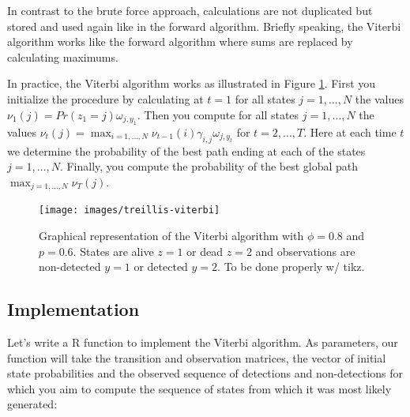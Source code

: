 \documentclass[
  12pt,
]{krantz}
\begin{document}
In contrast to the brute force approach, calculations are not duplicated but stored and used again like in the forward algorithm. Briefly speaking, the Viterbi algorithm works like the forward algorithm where sums are replaced by calculating maximums.

In practice, the Viterbi algorithm works as illustrated in Figure \ref{fig:treillis-viterbi}. First you initialize the procedure by calculating at \(t=1\) for all states \(j=1,\ldots,N\) the values \(\nu_1(j) = Pr(z_1 = j) \omega_{j,y_1}\). Then you compute for all states \(j=1,\ldots,N\) the values \(\nu_t(j) = \displaystyle{\max_{i=1,\ldots,N} \nu_{t-1}(i) \gamma_{i,j} \omega_{j,y_t}}\) for \(t = 2, \ldots, T\). Here at each time \(t\) we determine the probability of the best path ending at each of the states \(j=1,\ldots,N\). Finally, you compute the probability of the best global path \(\displaystyle{\max_{j=1,\ldots,N}\nu_T(j)}\).

\begin{figure}

{\centering \texttt{[image: images/treillis-viterbi]} 

}

\caption{Graphical representation of the Viterbi algorithm with $\phi = 0.8$ and $p = 0.6$. States are alive $z = 1$ or dead $z = 2$ and observations are non-detected $y = 1$ or detected $y = 2$. To be done properly w/ tikz.}\label{fig:treillis-viterbi}
\end{figure}

\hypertarget{implementation}{%
\subsection{Implementation}\label{implementation}}

Let's write a R function to implement the Viterbi algorithm. As parameters, our function will take the transition and observation matrices, the vector of initial state probabilities and the observed sequence of detections and non-detections for which you aim to compute the sequence of states from which it was most likely generated:
\end{document}
